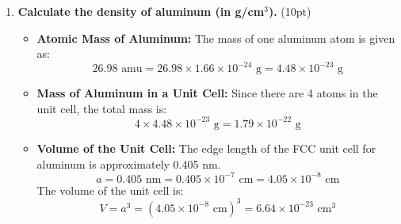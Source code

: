 \documentclass[10pt]{article}
\begin{document}
\begin{enumerate}[leftmargin=0.7cm, label=\textbf{\arabic*.}, itemsep=1em]
\begin{enumerate}[label=\textbf{\alph*.}, leftmargin=0.7cm, itemsep=0.5em]
        \begin{itemize}[leftmargin=0.5cm]
            \item \textbf{Atoms in an FCC Unit Cell:} An FCC unit cell contains atoms at the corners and at the centers of each face of the cube. There are:
            \begin{itemize}
                \item 8 corner atoms, each contributing \(\frac{1}{8}\) atom per unit cell: 
                \[
                8 \times \frac{1}{8} = 1 \text{ atom}
                \]
                \item 6 face-centered atoms, each contributing \(\frac{1}{2}\) atom per unit cell:
                \[
                6 \times \frac{1}{2} = 3 \text{ atoms}
                \]
            \end{itemize}
            \item \textbf{Total number of atoms:}
            \[
            1 + 3 = 4 \text{ atoms}
            \]
            Thus, there are \textbf{4 aluminum atoms} in an aluminum unit cell.
        \end{itemize}

        \item \textbf{Calculate the density of aluminum (in g/cm\(^3\)).} (10pt)
        
        \begin{itemize}[leftmargin=0.5cm]
            \item \textbf{Atomic Mass of Aluminum:} The mass of one aluminum atom is given as:
            \[
            26.98 \text{ amu} = 26.98 \times 1.66 \times 10^{-24} \text{ g} = 4.48 \times 10^{-23} \text{ g}
            \]

            \item \textbf{Mass of Aluminum in a Unit Cell:} Since there are 4 atoms in the unit cell, the total mass is:
            \[
            4 \times 4.48 \times 10^{-23} \text{ g} = 1.79 \times 10^{-22} \text{ g}
            \]
            
            \item \textbf{Volume of the Unit Cell:} The edge length of the FCC unit cell for aluminum is approximately 0.405 nm.
            \[
            a = 0.405 \text{ nm} = 0.405 \times 10^{-7} \text{ cm} = 4.05 \times 10^{-8} \text{ cm}
            \]
            The volume of the unit cell is:
            \[
            V = a^3 = (4.05 \times 10^{-8} \text{ cm})^3 = 6.64 \times 10^{-23} \text{ cm}^3
            \]


\end{itemize}
\end{enumerate}
\end{enumerate}
\end{document}
